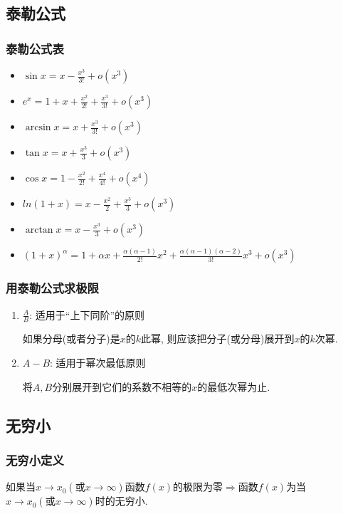 \subsection{泰勒公式}
\subsubsection{泰勒公式表}
\begin{multicols}{2}
\begin{itemize}
\item $ \sin x=x-\frac{x^{3}}{3!}+o(x^{3}) $
\item $ e^{x}=1+x+\frac{x^{2}}{2!}+\frac{x^{3}}{3!}+o(x^{3}) $
\item $ \arcsin x=x+\frac{x^{3}}{3!}+o(x^{3}) $
\item $ \tan x=x+\frac{x^{3}}{3}+o(x^{3}) $
\item $ \cos x=1-\frac{x^{2}}{2!}+\frac{x^{4}}{4!}+o(x^{4}) $
\item $ ln(1+x)=x-\frac{x^{2}}{2}+\frac{x^{3}}{3}+o(x^{3}) $
\item $ \arctan x=x-\frac{x^{3}}{3}+o(x^{3}) $
\item $ (1+x)^{\alpha}=1+\alpha x+\frac{\alpha (\alpha -1)}{2!}x^{2}+\frac{\alpha (\alpha -1)(\alpha -2)}{3!}x^{3}+o(x^{3}) $
\end{itemize}
\end{multicols}
\subsubsection{用泰勒公式求极限}
\begin{enumerate}
\item $ \frac{A}{B} $: 适用于``上下同阶''的原则 \par
如果分母(或者分子)是$ x $的$ k $此幂, 则应该把分子(或分母)展开到$ x $的$ k $次幂.
\item $ A-B $: 适用于幂次最低原则 \par
将$ A, B $分别展开到它们的系数不相等的$ x $的最低次幂为止.
\end{enumerate}
\subsection{无穷小}
\subsubsection{无穷小定义}
如果当$ x\rightarrow x_{0}(\text{或}x\rightarrow \infty) $函数$ f(x) $的极限为零$ \Rightarrow  $函数$ f(x) $为当$ x \rightarrow x_{0}(\text{或}x \rightarrow \infty ) $时的无穷小.
